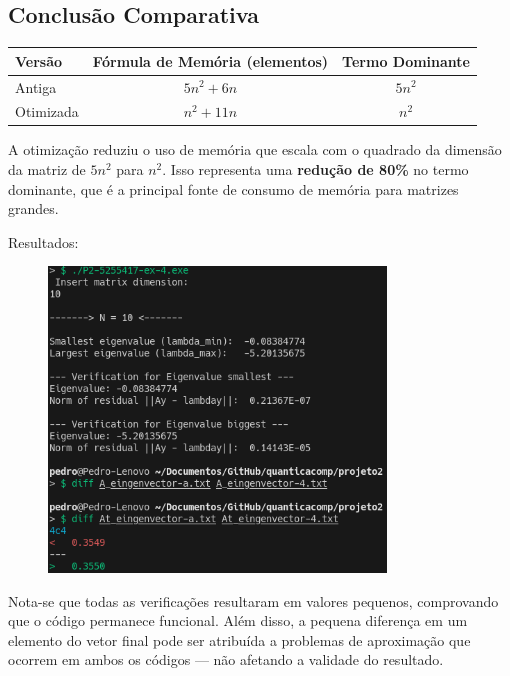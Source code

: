 \documentclass[12pt, a4paper]{article} %
\begin{document}
            \subsection*{Conclus\~ao Comparativa}

            \begin{table}[h!]
            \centering
            \begin{tabular}{|l|c|c|}
            \hline
            \textbf{Vers\~ao} & \textbf{F\'ormula de Mem\'oria (elementos)} & \textbf{Termo Dominante} \\
            \hline
            Antiga & $5n^2 + 6n$ & $5n^2$ \\
            Otimizada & $n^2 + 11n$ & $n^2$ \\
            \hline
            \end{tabular}
            \end{table}

            A otimiza\c{c}\~ao reduziu o uso de mem\'oria que escala com o quadrado da dimens\~ao da matriz de $5n^2$ para $n^2$. Isso representa uma \textbf{redu\c{c}\~ao de 80\%} no termo dominante, que \'e a principal fonte de consumo de mem\'oria para matrizes grandes.

        Resultados:
        \begin{figure}[H]
            \centering
            \includegraphics[width=0.8\textwidth]{../images/ex4.png}
        \end{figure}

        Nota-se que todas as verifica\c{c}\~oes resultaram em valores pequenos, comprovando que o c\'odigo permanece funcional. Al\'em disso, a pequena diferen\c{c}a em um elemento do vetor final pode ser atribu\'ida a problemas de aproxima\c{c}\~ao que ocorrem em ambos os c\'odigos --- n\~ao afetando a validade do resultado.
\end{document}
